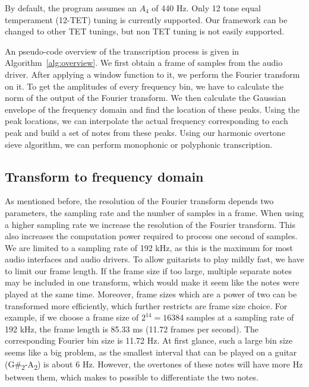 \documentclass[10pt,twocolumn]{article}
\begin{document}
By default, the program assumes an $A_4$ of 440 Hz. Only 12 tone equal temperament (12-TET) tuning is currently supported. Our framework can be changed to other TET tunings, but non TET tuning is not easily supported.

An pseudo-code overview of the transcription process is given in Algorithm~\ref{alg:overview}. We first obtain a frame of samples from the audio driver. After applying a window function to it, we perform the Fourier transform on it. To get the amplitudes of every frequency bin, we have to calculate the norm of the output of the Fourier transform. We then calculate the Gaussian envelope of the frequency domain and find the location of these peaks. Using the peak locations, we can interpolate the actual frequency corresponding to each peak and build a set of notes from these peaks. Using our harmonic overtone sieve algorithm, we can perform monophonic or polyphonic transcription.


\subsection{Transform to frequency domain}  \label{sub:four}
As mentioned before, the resolution of the Fourier transform depends two parameters, the sampling rate and the number of samples in a frame. When using a higher sampling rate we increase the resolution of the Fourier transform. This also increases the computation power required to process one second of samples. We are limited to a sampling rate of 192 kHz, as this is the maximum for most audio interfaces and audio drivers. To allow guitarists to play mildly fast, we have to limit our frame length. If the frame size if too large, multiple separate notes may be included in one transform, which would make it seem like the notes were played at the same time. Moreover, frame sizes which are a power of two can be transformed more efficiently, which further restricts are frame size choice. For example, if we choose a frame size of $2^{14} = 16384$ samples at a sampling rate of 192 kHz, the frame length is 85.33 ms (11.72 frames per second). The corresponding Fourier bin size is 11.72 Hz. At first glance, such a large bin size seems like a big problem, as the smallest interval that can be played on a guitar (G\#\textsubscript{2}-A\textsubscript{2}) is about 6 Hz. However, the overtones of these notes will have more Hz between them, which makes to possible to differentiate the two notes.%
\end{document}
